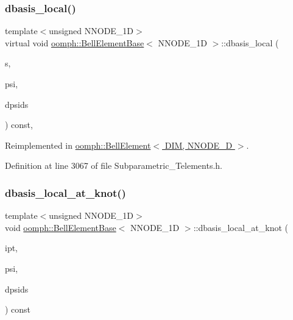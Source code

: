 \subsubsection{\texorpdfstring{dbasis\+\_\+local()}{dbasis\_local()}}
{\footnotesize\ttfamily template$<$unsigned N\+N\+O\+D\+E\+\_\+1D$>$ \\
virtual void \hyperlink{classoomph_1_1BellElementBase}{oomph\+::\+Bell\+Element\+Base}$<$ N\+N\+O\+D\+E\+\_\+1D $>$\+::dbasis\+\_\+local (\begin{DoxyParamCaption}\item[{const \hyperlink{classoomph_1_1Vector}{Vector}$<$ double $>$ \&}]{s,  }\item[{\hyperlink{classoomph_1_1Shape}{Shape} \&}]{psi,  }\item[{\hyperlink{classoomph_1_1DShape}{D\+Shape} \&}]{dpsids }\end{DoxyParamCaption}) const\hspace{0.3cm}{\ttfamily [inline]}, {\ttfamily [virtual]}}



Reimplemented in \hyperlink{classoomph_1_1BellElement_aeeceae57e24c50d838e993fd92c8bc68}{oomph\+::\+Bell\+Element$<$ D\+I\+M, N\+N\+O\+D\+E\+\_\+D $>$}.



Definition at line 3067 of file Subparametric\+\_\+\+Telements.\+h.

\mbox{\label{classoomph_1_1BellElementBase_a795fca0c9cfa01bf6f966f4f0a69b312}} 
\subsubsection{\texorpdfstring{dbasis\+\_\+local\+\_\+at\+\_\+knot()}{dbasis\_local\_at\_knot()}}
{\footnotesize\ttfamily template$<$unsigned N\+N\+O\+D\+E\+\_\+1D$>$ \\
void \hyperlink{classoomph_1_1BellElementBase}{oomph\+::\+Bell\+Element\+Base}$<$ N\+N\+O\+D\+E\+\_\+1D $>$\+::dbasis\+\_\+local\+\_\+at\+\_\+knot (\begin{DoxyParamCaption}\item[{const unsigned \&}]{ipt,  }\item[{\hyperlink{classoomph_1_1Shape}{Shape} \&}]{psi,  }\item[{\hyperlink{classoomph_1_1DShape}{D\+Shape} \&}]{dpsids }\end{DoxyParamCaption}) const\hspace{0.3cm}{\ttfamily [inline]}}



